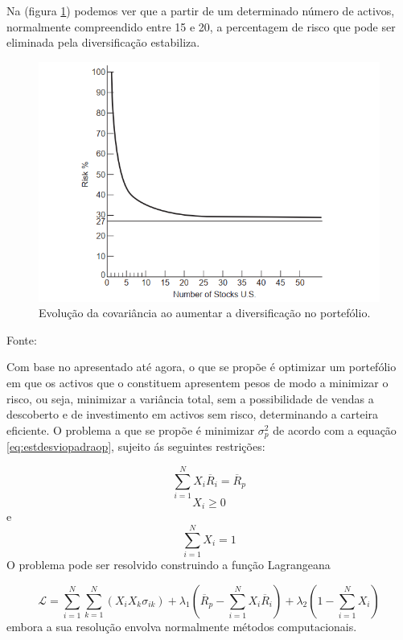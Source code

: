 \documentclass[
  12pt,
  a4paper,
  openany]{book}
\theoremstyle{definition}
\theoremstyle{definition}
\theoremstyle{definition}
\theoremstyle{remark}
\begin{document}
Na (figura \ref{fig:covusa}) podemos ver que a partir de um determinado número de activos, normalmente compreendido entre 15 e 20, a percentagem de risco que pode ser eliminada pela diversificação estabiliza.



\begin{figure}

{\centering \includegraphics[width=0.6\linewidth]{image/covusa} 

}

\caption{Evolução da covariância ao aumentar a diversificação no portefólio.}\label{fig:covusa}
\end{figure}
\FloatBarrier
\centering

Fonte: \citep[pp.58]{Goetzmann2014}

\justifying
\bigskip

Com base no apresentado até agora, o que se propõe é optimizar um portefólio em que os activos que o constituem apresentem pesos de modo a minimizar o risco, ou seja, minimizar a variância total, sem a possibilidade de vendas a descoberto e de investimento em activos sem risco, determinando a carteira eficiente. O problema a que se propõe é minimizar \(\sigma_{p}^{2}\) de acordo com a equação \eqref{eq:estdesviopadraop}, sujeito ás seguintes restrições:

\begin{equation} 
  \sum_{i=1}^{N}X_{i}\overline{R}_{i}=\overline{R}_{p}
  \label{eq:und}
\end{equation}
\[X_{i}\geq0\] e \[\sum_{i=1}^{N}X_{i}=1\]
O problema pode ser resolvido construindo a função Lagrangeana

\begin{equation} 
  \mathcal{L} = \sum_{i=1}^{N}\sum_{k=1}^{N}(X_{i}X_{k}\sigma_{ik})+\lambda_{1}(\overline{R}_{p}-\sum_{i=1}^{N}X_{i}\overline{R}_{i})+\lambda_{2}(1-\sum_{i=1}^{N}X_{i})
  \label{eq:lagrangeana}
\end{equation}
embora a sua resolução envolva normalmente métodos computacionais.
\end{document}
